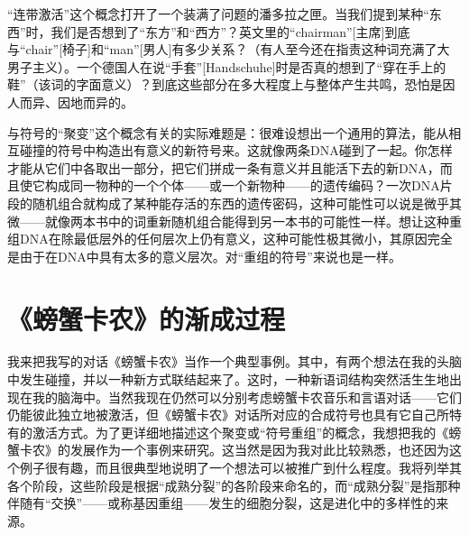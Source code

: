 “连带激活”这个概念打开了一个装满了问题的潘多拉之匣。当我们提到某种“东西”时，我们是否想到了“东方”和“西方”？英文里的“chairman”[主席]到底与“chair”[椅子]和“man”[男人]有多少关系？（有人至今还在指责这种词充满了大男子主义）。一个德国人在说“手套”[Handschuhe]时是否真的想到了“穿在手上的鞋”（该词的字面意义）？到底这些部分在多大程度上与整体产生共鸣，恐怕是因人而异、因地而异的。

与符号的“聚变”这个概念有关的实际难题是：很难设想出一个通用的算法，能从相互碰撞的符号中构造出有意义的新符号来。这就像两条DNA碰到了一起。你怎样才能从它们中各取出一部分，把它们拼成一条有意义并且能活下去的新DNA，而且使它构成同一物种的一个个体——或一个新物种——的遗传编码？一次DNA片段的随机组合就构成了某种能存活的东西的遗传密码，这种可能性可以说是微乎其微——就像两本书中的词重新随机组合能得到另一本书的可能性一样。想让这种重组DNA在除最低层外的任何层次上仍有意义，这种可能性极其微小，其原因完全是由于在DNA中具有太多的意义层次。对“重组的符号”来说也是一样。

\section{《螃蟹卡农》的渐成过程}

我来把我写的对话《螃蟹卡农》当作一个典型事例。其中，有两个想法在我的头脑中发生碰撞，并以一种新方式联结起来了。这时，一种新语词结构突然活生生地出现在我的脑海中。当然我现在仍然可以分别考虑螃蟹卡农音乐和言语对话——它们仍能彼此独立地被激活，但《螃蟹卡农》对话所对应的合成符号也具有它自己所特有的激活方式。为了更详细地描述这个聚变或“符号重组”的概念，我想把我的《螃蟹卡农》的发展作为一个事例来研究。这当然是因为我对此比较熟悉，也还因为这个例子很有趣，而且很典型地说明了一个想法可以被推广到什么程度。我将列举其各个阶段，这些阶段是根据“成熟分裂”的各阶段来命名的，而“成熟分裂”是指那种伴随有“交换”——或称基因重组——发生的细胞分裂，这是进化中的多样性的来源。

